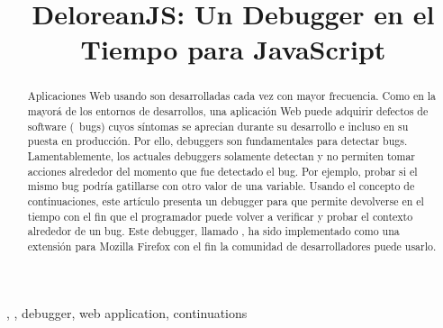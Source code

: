 \documentclass[conference]{IEEEtran}
\begin{document}
\title{DeloreanJS: Un Debugger en el Tiempo para JavaScript\\
}

\author{
\and
{}
\and
{}
}

\maketitle

\begin{abstract}
Aplicaciones Web usando \javascript son desarrolladas cada vez con mayor frecuencia. Como en la mayor\'a de los entornos de desarrollos, una aplicaci\'on Web puede adquirir defectos de software (\aka~bugs) cuyos s\'intomas se aprecian durante su desarrollo e incluso en su puesta en producci\'on. Por ello, debuggers son fundamentales para detectar bugs. Lamentablemente, los actuales debuggers solamente detectan y no permiten tomar acciones alrededor del momento que fue detectado el bug. Por ejemplo, probar si el mismo bug podr\'ia gatillarse con otro valor de una variable. Usando el concepto de continuaciones, este art\'iculo presenta un debugger para \javascript que permite devolverse en el tiempo con el fin que el programador puede volver a verificar y probar el contexto alrededor de un bug. Este debugger, llamado \deloreanjs, ha sido implementado como una extensi\'on para Mozilla Firefox con el fin la comunidad de desarrolladores puede usarlo.         
\end{abstract}

\begin{IEEEkeywords}
\deloreanjs, \javascript, debugger, web application, continuations
\end{IEEEkeywords}
\end{document}
